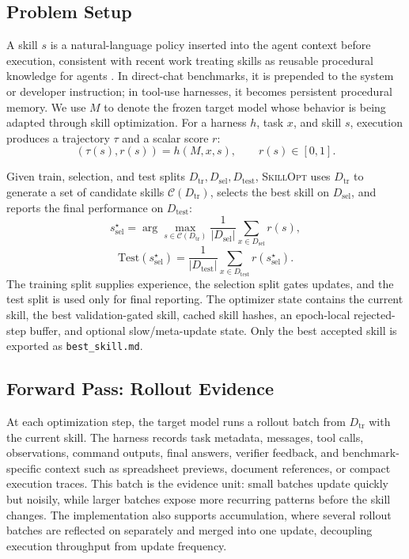 \documentclass{llmxive}
\providecommand{\ourmethod}{\textsc{SkillOpt}\xspace}
\begin{document}
\subsection{Problem Setup}
\label{sec:method_skill}

A skill $s$ is a natural-language policy inserted into the agent context before execution, consistent with recent work treating skills as reusable procedural knowledge for agents \citep{li2026skillsbench,jiang2026sok}. In direct-chat benchmarks, it is prepended to the system or developer instruction; in tool-use harnesses, it becomes persistent procedural memory. We use $M$ to denote the frozen target model whose behavior is being adapted through skill optimization. For a harness $h$, task $x$, and skill $s$, execution produces a trajectory $\tau$ and a scalar score $r$:
\begin{equation}
    (\tau(s), r(s)) = h(M, x, s), \qquad r(s) \in [0,1].
\end{equation}

Given train, selection, and test splits $D_{\mathrm{tr}},D_{\mathrm{sel}},D_{\mathrm{test}}$, \ourmethod{} uses $D_{\mathrm{tr}}$ to generate a set of candidate skills $\mathcal{C}(D_{\mathrm{tr}})$, selects the best skill on $D_{\mathrm{sel}}$, and reports the final performance on $D_{\mathrm{test}}$:
\begin{equation}
    s^\star_{\mathrm{sel}}
    =
    \arg\max_{s \in \mathcal{C}(D_{\mathrm{tr}})}
    \frac{1}{|D_{\mathrm{sel}}|}
    \sum_{x \in D_{\mathrm{sel}}}
    r(s),
\end{equation}
\begin{equation}
    \mathrm{Test}(s^\star_{\mathrm{sel}})
    =
    \frac{1}{|D_{\mathrm{test}}|}
    \sum_{x \in D_{\mathrm{test}}}
    r(s^\star_{\mathrm{sel}}).
\end{equation}
The training split supplies experience, the selection split gates updates, and the test split is used only for final reporting. The optimizer state contains the current skill, the best validation-gated skill, cached skill hashes, an epoch-local rejected-step buffer, and optional slow/meta-update state. Only the best accepted skill is exported as \texttt{best\_skill.md}.

\subsection{Forward Pass: Rollout Evidence}
\label{sec:method_forward}

At each optimization step, the target model runs a rollout batch from $D_{\mathrm{tr}}$ with the current skill. The harness records task metadata, messages, tool calls, observations, command outputs, final answers, verifier feedback, and benchmark-specific context such as spreadsheet previews, document references, or compact execution traces. This batch is the evidence unit: small batches update quickly but noisily, while larger batches expose more recurring patterns before the skill changes. The implementation also supports accumulation, where several rollout batches are reflected on separately and merged into one update, decoupling execution throughput from update frequency.
\end{document}

